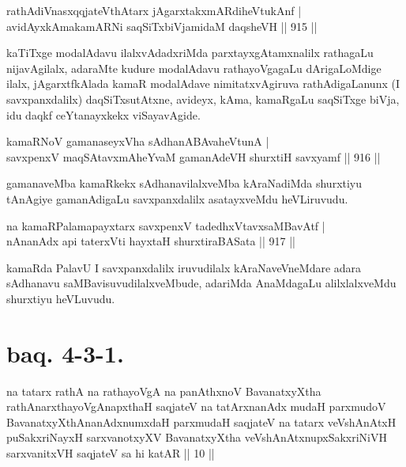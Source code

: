 \begin{shl}
rathAdiVnasxqqjateV\s thAtarx jAgarxtakxmARdiheVtukAnf | \\
avidAyxkAmakamARNi saqSiTxbiVjamidaM daqsheVH \hfill||  915 ||  
\end{shl}

\begin{artha}
kaTiTxge modalAdavu ilalxvAdadxriMda parxtayxgAtamxnalilx rathagaLu nijavAgilalx, adaraMte kudure modalAdavu rathayoVgagaLu dArigaLoMdige ilalx, jAgarxtfkAlada kamaR modalAdave nimitatxvAgiruva rathAdigaLanunx (I savxpanxdalilx) daqSiTxsutAtxne, avideyx, kAma, kamaRgaLu saqSiTxge biVja, idu daqkf ceYtanayxkekx viSayavAgide.
\end{artha}


\begin{shl}
kamaRNoV gamanaseyxVha sAdhanABAvaheVtunA | \\
savxpenxV maqSAtavxmAheYvaM gamanAdeVH shurxtiH savxyamf \hfill||  916 ||  
\end{shl}

\begin{artha}
gamanaveMba kamaRkekx sAdhanavilalxveMba kAraNadiMda shurxtiyu tAnAgiye gamanAdigaLu savxpanxdalilx asatayxveMdu heVLiruvudu.
\end{artha}


\begin{shl}
na kamaRPalamapayxtarx savxpenxV tadedhxVtavxsaMBavAtf | \\
nA\s \s nanAdx api taterxVti hayxtaH shurxtiraBASata \hfill||  917 ||  
\end{shl}

\begin{artha}
kamaRda PalavU I savxpanxdalilx iruvudilalx kAraNaveVneMdare adara sAdhanavu saMBavisuvudilalxveMbude, adariMda AnaMdagaLu alilxlalxveMdu shurxtiyu heVLuvudu.
\end{artha}

\section*{baq. 4-3-1.}

\begin{shl}
na tatarx rathA na rathayoVgA na panAthxnoV BavanatxyXtha rathAnarxthayoVgAnapxthaH saqjateV na tatArxnanAdx mudaH parxmudoV BavanatxyXthAnanAdxnumxdaH parxmudaH saqjateV na tatarx veVshAnAtxH puSakxriNayxH sarxvanotxyXV BavanatxyXtha veVshAnAtxnupxSakxriNiVH sarxvanitxVH saqjateV sa hi katAR || 10 ||
\end{shl}

